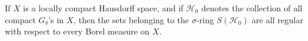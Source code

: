 If $X$ is a locally compact Hausdorff space, and if $\mathcal{H}_0$ denotes the collection of all compact $G_\delta$'s in $X$, then the sets belonging to the $\sigma$-ring $S(\mathcal{H}_0)$ are all regular with respect to every Borel measure on $X$.
